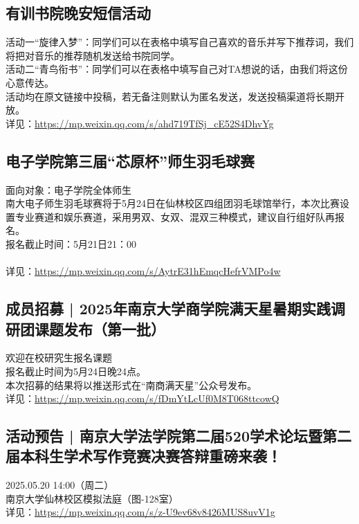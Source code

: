 \documentclass[letterpaper, 12pt]{article}
\begin{document}
\begin{multicols}{2}
\subsection{有训书院晚安短信活动} %
活动一“旋律入梦”：同学们可以在表格中填写自己喜欢的音乐并写下推荐词，我们将把对音乐的推荐随机发送给书院同学。
\\活动二“青鸟衔书”：同学们可以在表格中填写自己对TA想说的话，由我们将这份心意传达。
\\活动均在原文链接中投稿，若无备注则默认为匿名发送，发送投稿渠道将长期开放。
\\详见：\url{https://mp.weixin.qq.com/s/ahd719TfSj_cE52S4DhvYg}

\subsection{电子学院第三届“芯原杯”师生羽毛球赛} %
面向对象：电子学院全体师生
\\南大电子师生羽毛球赛将于5月24日在仙林校区四组团羽毛球馆举行，本次比赛设置专业赛道和娱乐赛道，采用男双、女双、混双三种模式，建议自行组好队再报名。
\\报名截止时间：5月21日21：00
\\
\\详见：\url{https://mp.weixin.qq.com/s/AytrE31hEmqcHefrVMPo4w}



\subsection{成员招募 | 2025年南京大学商学院满天星暑期实践调研团课题发布（第一批）} %
欢迎在校研究生报名课题
\\报名截止时间为5月24日晚24点。
\\本次招募的结果将以推送形式在“南商满天星”公众号发布。
\\详见：\url{https://mp.weixin.qq.com/s/fDmYtLcUf0M8T068ttcowQ}

\subsection{活动预告 | 南京大学法学院第二届520学术论坛暨第二届本科生学术写作竞赛决赛答辩重磅来袭！} %
2025.05.20 14:00（周二）
\\南京大学仙林校区模拟法庭（图-128室）
\\详见：\url{https://mp.weixin.qq.com/s/z-U9ev68v8426MUS8uvV1g}


\end{multicols}
\end{document}
